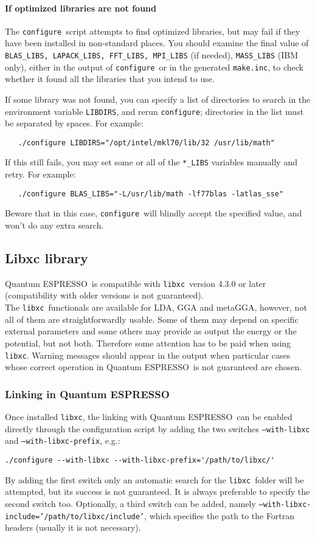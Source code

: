 \documentclass[12pt,a4paper]{article}
\def\qe{{\sc Quantum ESPRESSO}}
\def\configure{\texttt{configure}}
\def\libxc{\texttt{libxc}}
\begin{document}
\paragraph{If optimized libraries are not found}
The \configure\ script attempts to find optimized libraries, but may fail
if they have been installed in non-standard places. You should examine
the final value of \texttt{BLAS\_LIBS, LAPACK\_LIBS, FFT\_LIBS, MPI\_LIBS} (if needed),
\texttt{MASS\_LIBS} (IBM only), either in the output of \configure\ or in the generated
\texttt{make.inc}, to check whether it found all the libraries that you intend to use.

If some library was not found, you can specify a list of directories to search
in the environment variable \texttt{LIBDIRS},
and rerun \configure; directories in the
list must be separated by spaces. For example:
\begin{verbatim}
   ./configure LIBDIRS="/opt/intel/mkl70/lib/32 /usr/lib/math"
\end{verbatim}
If this still fails, you may set some or all of the \texttt{*\_LIBS} variables manually
and retry. For example:
\begin{verbatim}
   ./configure BLAS_LIBS="-L/usr/lib/math -lf77blas -latlas_sse"
\end{verbatim}
Beware that in this case, \configure\ will blindly accept the specified value,
and won't do any extra search.

\subsection{Libxc library}

\qe\ is compatible with \libxc\ version 4.3.0 or later (compatibility with older versions is not guaranteed).\\
The \libxc\ functionals are available for LDA, GGA and metaGGA, however, not all of them are straightforwardly usable. Some of them may depend on specific external parameters and some others may provide as output the energy or the potential, but not both. Therefore some attention has to be paid when using \libxc. Warning messages should appear in the output when particular cases whose correct operation in \qe\ is not guaranteed are chosen.

\subsubsection{Linking in \qe}
Once installed \libxc, the linking with \qe\ can be enabled directly through the configuration script by adding the two switches \texttt{--with-libxc} and \texttt{--with-libxc-prefix}, e.g.:
\begin{verbatim}
./configure --with-libxc --with-libxc-prefix='/path/to/libxc/'
\end{verbatim}
By adding the first switch only an automatic search for the \libxc\ folder will be attempted, but its success is not guaranteed. It is always preferable to specify the second switch too. Optionally, a third switch can be added, namely \texttt{--with-libxc-include='/path/to/libxc/include'}, which specifies the path to the Fortran headers (usually it is not necessary).
\end{document}
